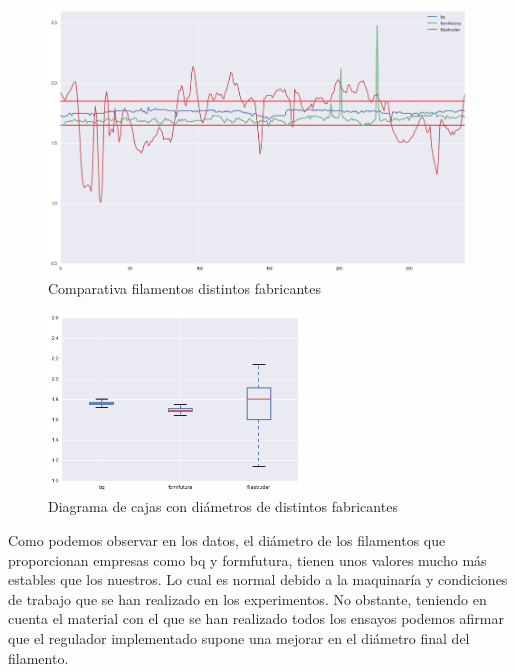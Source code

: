 \begin{figure}[H]
    \centering
    \includegraphics[width=0.99\textwidth]{images/producciones/conclusiones/output_8_1.png}
    \caption{Comparativa filamentos distintos fabricantes}
    \label{fig:concl_graf5}
\end{figure}

\begin{figure}[H]
    \centering
    \includegraphics[width=0.6\textwidth]{images/producciones/conclusiones/output_9_1.png}
    \caption{Diagrama de cajas con diámetros de distintos fabricantes}
    \label{fig:concl_cajas5}
\end{figure}

Como podemos observar en los datos, el diámetro de los filamentos que proporcionan empresas como bq y formfutura, tienen unos valores mucho más estables que los nuestros. Lo cual es normal debido a la maquinaría y condiciones de trabajo que se han realizado en los experimentos. No obstante, teniendo en cuenta el material con el que se han realizado todos los ensayos podemos afirmar que el regulador implementado supone una mejorar en el diámetro final del filamento.